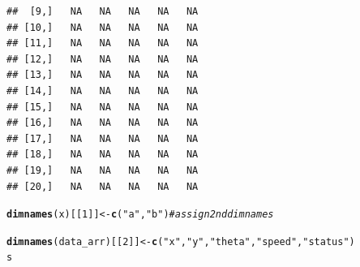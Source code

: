 \documentclass{article}\usepackage[]{graphicx}\usepackage[]{color}
\makeatletter
\newcommand{\hlnum}[1]{\textcolor[rgb]{0.686,0.059,0.569}{#1}}%
\newcommand{\hlstr}[1]{\textcolor[rgb]{0.192,0.494,0.8}{#1}}%
\newcommand{\hlcom}[1]{\textcolor[rgb]{0.678,0.584,0.686}{\textit{#1}}}%
\newcommand{\hlstd}[1]{\textcolor[rgb]{0.345,0.345,0.345}{#1}}%
\newcommand{\hlkwb}[1]{\textcolor[rgb]{0.69,0.353,0.396}{#1}}%
\newcommand{\hlkwd}[1]{\textcolor[rgb]{0.737,0.353,0.396}{\textbf{#1}}}%
\newenvironment{kframe}{%
 \def\at@end@of@kframe{}%
 \ifinner\ifhmode%
  \def\at@end@of@kframe{\end{minipage}}%
  \begin{minipage}{\columnwidth}%
 \fi\fi%
 \def\FrameCommand##1{\hskip\@totalleftmargin \hskip-\fboxsep
 \colorbox{shadecolor}{##1}\hskip-\fboxsep
     \hskip-\linewidth \hskip-\@totalleftmargin \hskip\columnwidth}%
 \MakeFramed {\advance\hsize-\width
   \@totalleftmargin\z@ \linewidth\hsize
   \@setminipage}}%
 {\par\unskip\endMakeFramed%
 \at@end@of@kframe}
\newenvironment{knitrout}{}{} %
\makeatother
\begin{document}
\begin{knitrout}
\begin{kframe}
\begin{verbatim}
##  [9,]   NA   NA   NA   NA   NA
## [10,]   NA   NA   NA   NA   NA
## [11,]   NA   NA   NA   NA   NA
## [12,]   NA   NA   NA   NA   NA
## [13,]   NA   NA   NA   NA   NA
## [14,]   NA   NA   NA   NA   NA
## [15,]   NA   NA   NA   NA   NA
## [16,]   NA   NA   NA   NA   NA
## [17,]   NA   NA   NA   NA   NA
## [18,]   NA   NA   NA   NA   NA
## [19,]   NA   NA   NA   NA   NA
## [20,]   NA   NA   NA   NA   NA
\end{verbatim}
\begin{alltt}
\hlkwd{dimnames}\hlstd{(x)[[}\hlnum{1}\hlstd{]]} \hlkwb{<-} \hlkwd{c}\hlstd{(}\hlstr{"a"}\hlstd{,} \hlstr{"b"}\hlstd{)}  \hlcom{# assign 2nd dim names}
\end{alltt}


{\ttfamily\noindent\bfseries{}}\begin{alltt}
\hlkwd{dimnames}\hlstd{(data_arr)[[}\hlnum{2}\hlstd{]]} \hlkwb{<-} \hlkwd{c}\hlstd{(}\hlstr{"x"}\hlstd{,} \hlstr{"y"}\hlstd{,} \hlstr{"theta"}\hlstd{,} \hlstr{"speed"}\hlstd{,} \hlstr{"status"}\hlstd{)}
\hlstd{s}
\end{alltt}



\end{kframe}
\end{knitrout}
\end{document}
